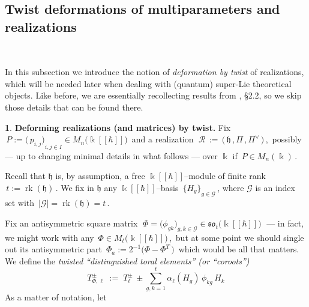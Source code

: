 \documentclass[12pt,reqno,twoside,a4paper]{amsart}
\numberwithin{equation}{section}
\theoremstyle{definition}
\newtheorem{free text}[lema]{}
\theoremstyle{remark}
\newcommand \rk{\operatorname{rk}}
\newcommand{\R}{{\mathcal R}}
\newcommand{\G}{{\mathcal G}}
\def \kh{{\Bbbk[[\hbar]]}}
\def \G {\mathcal{G}}
\def \lieh{\mathfrak{h}}
\def \lieso{\mathfrak{so}}
\theoremstyle{plain}
\begin{document}
\medskip
  \eject


\subsection{Twist deformations of multiparameters and realizations}
%
  \label{subsec: twisted-realiz}  {\ }
%
 \vskip7pt
%

   In this subsection we introduce the notion of  \textit{deformation by twist\/}  of realizations, which will be needed later when dealing with (quantum) super-Lie theoretical objects.  Like before, we are essentially recollecting results from  \cite{GG3}, \S 2.2,  so we skip those details that can be found there.

\vskip9pt

\begin{free text}  \label{twist-deform.'s x mpmatr.'s & realiz.'s}
%
 {\bf Deforming realizations (and matrices) by twist.}  Fix  $ \, P := {\big(\, p_{i,j} \big)}_{i, j \in I} \in M_n\big(\kh\big) \, $
 and a realization  $ \; \R \, := \, \big(\, \lieh \, , \Pi \, , \Pi^\vee \,\big) \, $,
 \,possibly   --- up to changing minimal details in what follows ---   over  $ \Bbbk $  if  $ \, P \in M_n(\Bbbk) \, $.
                                                                       \par
   Recall that  $ \lieh $  is, by assumption, a free  $ \kh $--module  of finite rank  $ \, t := \rk(\lieh) \, $.
   We fix in  $ \lieh $  any  $ \kh $--basis  $ \, {\big\{ H_g \big\}}_{g \in \G} \, $,
   where  $ \G $  is an index set with  $ \, |\G| = \rk(\lieh) = t \, $.
                                                                       \par
   Fix an antisymmetric square matrix  $ \; \Phi = \big( \phi_{gk} \big)_{g, k \in \G} \in \lieso_t\big(\kh\big) \; $
   --- in fact, we might work with any  $ \, \Phi \in M_t\big(\kh\big) \, $,
   \,but at some point we should single out its antisymmetric part
   $ \, \Phi_a := 2^{-1} \big( \Phi - \Phi^{\scriptscriptstyle T} \,\big) \, $
   which would be all that matters.  We define the  \textsl{twisted ``distinguished toral elements'' (or ``coroots'')}
%
\begin{equation}  \label{eq: T-phi}
  T^\pm_{{\scriptscriptstyle \Phi},\ell} \; := \;
  T^\pm_\ell \, \pm {\textstyle \sum_{g,k=1}^t} \alpha_\ell(H_g) \, \phi_{kg} \, H_k
%
\end{equation}
%
 As a matter of notation, let

\end{free text}
\end{document}
